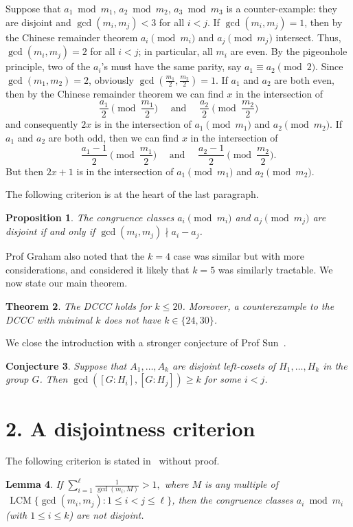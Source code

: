\documentclass[12pt]{article}
\DeclareMathOperator{\lcm}{LCM}
\newtheorem{thm}{Theorem}%
\newtheorem{lem}[thm]{Lemma}
\newtheorem{cnj}[thm]{Conjecture}
\newtheorem{prop}[thm]{Proposition}
\begin{document}
Suppose that $a_1 \bmod{m_1}$, $a_2\bmod{m_2}$, $a_3\bmod{m_3}$ is a counter-example: they are disjoint and
$\gcd(m_i,m_j)<3$ for all $i<j$. If $\gcd(m_i,m_j)=1$, then by the Chinese remainder theorem $a_i\pmod{m_i}$ and
$a_j\pmod{m_j}$ intersect. Thus, $\gcd(m_i,m_j)=2$ for all $i<j$; in particular, all $m_i$ are even. By the
pigeonhole principle, two of the $a_i$'s must have the same parity, say $a_1\equiv a_2\pmod{2}$. Since
$\gcd(m_1,m_2)=2$, obviously $\gcd(\frac{m_1}{2},\frac{m_2}{2})=1$. If $a_1$ and $a_2$ are both even, then by
the Chinese remainder theorem we can find $x$ in the intersection of
    \[
    \frac{a_1}{2} \pmod{\frac{m_1}{2}} \quad\text{ and }\quad  \frac{a_2}{2} \pmod{\frac{m_2}{2}}
    \]
and consequently $2x$ is in the intersection of $a_1 \pmod {m_1}$ and $a_2 \pmod{m_2}$. If $a_1$ and $a_2$ are
both odd, then we can find $x$ in the intersection of
    \[
    \frac{a_1-1}{2} \pmod{\frac{m_1}{2}} \quad \text{ and }\quad \frac{a_2-1}{2} \pmod{\frac{m_2}{2}}.
    \]
But then $2x+1$ is in the intersection of $a_1 \pmod {m_1}$ and $a_2 \pmod{m_2}$.

The following criterion is at the heart of the last paragraph.
\begin{prop}\label{Fraenkel}
The congruence classes $a_i\pmod{m_i}$ and $a_j\pmod{m_j}$ are disjoint if and only if $\gcd(m_i,m_j) \nmid
a_i-a_j$.
\end{prop}

Prof Graham also noted that the $k=4$ case was similar but with more considerations, and considered it likely
that $k=5$ was similarly tractable. We now state our main theorem.

\begin{thm}
The DCCC holds for $k\le 20$. Moreover, a counterexample to the DCCC with minimal $k$ does not have
$k\in\{24,30\}$.
\end{thm}

We close the introduction with a stronger conjecture of Prof Sun~\cite{Sun2}.
\begin{cnj}
Suppose that $A_1, \dots, A_k$ are disjoint left-cosets of $H_1,\dots, H_k$ in the group $G$. Then
$\gcd([G:H_i],[G:H_j]) \ge k$ for some $i<j$.
\end{cnj}


\vskip 30pt
\section*{\normalsize 2. A disjointness criterion}
The following criterion is stated in~\cite{Huhn.Megyesi} without proof.
\begin{lem}\label{lem:test}
If
    $\displaystyle \sum_{i=1}^\ell \frac{1}{\gcd(m_i,M)} > 1,$
where $M$ is any multiple of $\,\lcm\{\gcd(m_i,m_j) \colon 1\le i < j\le \ell\}$, then the congruence classes
$a_i\bmod{m_i}$ (with $1\le i \le k$) are not disjoint.
\end{lem}
\end{document}
